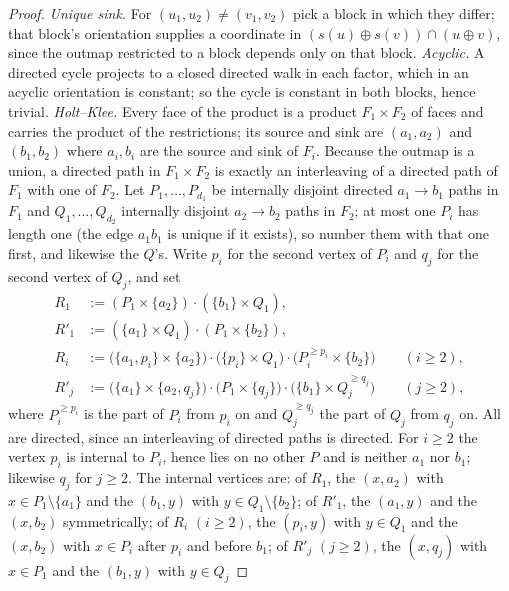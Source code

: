 \begin{proof}
\emph{Unique sink.} For $(u_1,u_2)\ne(v_1,v_2)$ pick a block in which they
differ; that block's orientation supplies a coordinate in
$(s(u)\oplus s(v))\cap(u\oplus v)$, since the outmap restricted to a block
depends only on that block.  \emph{Acyclic.} A directed cycle projects to a
closed directed walk in each factor, which in an acyclic orientation is
constant; so the cycle is constant in both blocks, hence trivial.
\emph{Holt--Klee.} Every face of the product is a product $F_1\times F_2$ of
faces and carries the product of the restrictions; its source and sink are
$(a_1,a_2)$ and $(b_1,b_2)$ where $a_i,b_i$ are the source and sink of $F_i$.
Because the outmap is a union, a directed path in $F_1\times F_2$ is exactly
an interleaving of a directed path of $F_1$ with one of $F_2$.  Let
$P_1,\dots,P_{d_1}$ be internally disjoint directed $a_1\to b_1$ paths in
$F_1$ and $Q_1,\dots,Q_{d_2}$ internally disjoint $a_2\to b_2$ paths in $F_2$;
at most one $P_i$ has length one (the edge $a_1b_1$ is unique if it exists),
so number them with that one first, and likewise the $Q$'s.  Write $p_i$ for
the second vertex of $P_i$ and $q_j$ for the second vertex of $Q_j$, and set
\begin{align*}
 R_1  &:= (P_1\times\{a_2\})\cdot(\{b_1\}\times Q_1),\\
 R'_1 &:= (\{a_1\}\times Q_1)\cdot(P_1\times\{b_2\}),\\
 R_i  &:= \bigl(\{a_1,p_i\}\times\{a_2\}\bigr)\cdot
          \bigl(\{p_i\}\times Q_1\bigr)\cdot
          \bigl(P_i^{\ge p_i}\times\{b_2\}\bigr)\qquad(i\ge2),\\
 R'_j &:= \bigl(\{a_1\}\times\{a_2,q_j\}\bigr)\cdot
          \bigl(P_1\times\{q_j\}\bigr)\cdot
          \bigl(\{b_1\}\times Q_j^{\ge q_j}\bigr)\qquad(j\ge2),
\end{align*}
where $P_i^{\ge p_i}$ is the part of $P_i$ from $p_i$ on and
$Q_j^{\ge q_j}$ the part of $Q_j$ from $q_j$ on.
All are directed, since an interleaving of directed paths is directed.  For
$i\ge2$ the vertex $p_i$ is internal to $P_i$, hence lies on no other $P$ and
is neither $a_1$ nor $b_1$; likewise $q_j$ for $j\ge2$.  The internal vertices
are: of $R_1$, the $(x,a_2)$ with $x\in P_1\setminus\{a_1\}$ and the
$(b_1,y)$ with $y\in Q_1\setminus\{b_2\}$; of $R'_1$, the $(a_1,y)$ and the
$(x,b_2)$ symmetrically; of $R_i$ $(i\ge2)$, the $(p_i,y)$ with $y\in Q_1$ and
the $(x,b_2)$ with $x\in P_i$ after $p_i$ and before $b_1$; of $R'_j$
$(j\ge2)$, the $(x,q_j)$ with $x\in P_1$ and the $(b_1,y)$ with $y\in Q_j$

\end{proof}
